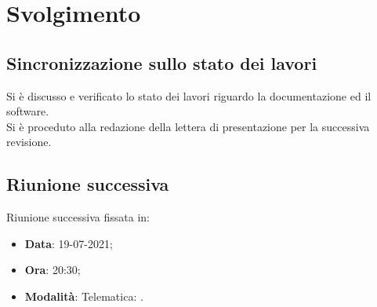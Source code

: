 \documentclass[]{article}
\begin{document}
	\newpage

	\section{Svolgimento}
		\subsection{Sincronizzazione sullo stato dei lavori}
		Si è discusso e verificato lo stato dei lavori riguardo la documentazione ed il software.\\
		Si è proceduto alla redazione della lettera di presentazione per la successiva revisione.\\
		
	\subsection{Riunione successiva}
	Riunione successiva fissata in:
	\begin{itemize}
		\item \textbf{Data}: 19-07-2021;
		\item \textbf{Ora}: 20:30;
		\item \textbf{Modalità}: Telematica: .\\
	\end{itemize}
\end{document}
